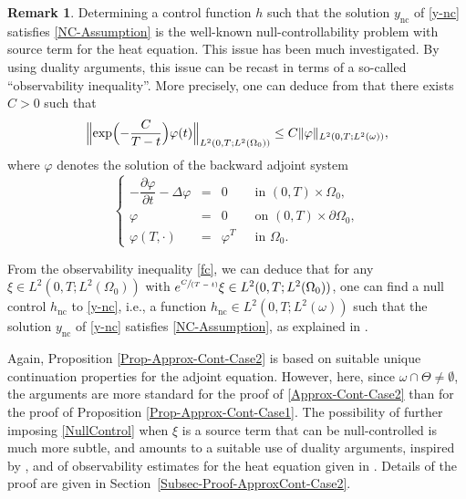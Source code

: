 \documentclass[11pt]{article}
\newcommand{\ie}{i.e.,\xspace}
\numberwithin{equation}{section}
\newcommand{\spfrac}[2]{\sfrac{#1}{(#2)}}
\newcommand{\nc}{\mathrm{nc}}
\newcommand{\Bnorm}[1]{\Bigl\Vert#1\Bigr\Vert}
\theoremstyle{definition}
\newtheorem{remark}[theorem]{Remark}
\begin{document}
\begin{remark}
Determining a control function $h$ such that the solution $y_{\nc}$ of \eqref{y-nc} satisfies \eqref{NC-Assumption} is the well-known null-controllability problem with source term for the heat equation. This issue has been much investigated. By using duality arguments, this issue can be recast in terms of a so-called ``observability inequality''. More precisely, one can deduce from \cite[Lem.\,2.1]{FursikovImanuvilov} that there exists $C>0$ such that
\begin{equation}\label{fc}
\Bnorm{\exp\Bigl(- \frac{C}{T-t}\Bigr)\varphi(t)}_ {L^2(0,T; L^2(\Omega_0))} \leq C \| \varphi \|_{L^2(0,T; L^2(\omega))},
\end{equation}
where $\varphi$ denotes the solution of the backward adjoint system
\begin{equation*}
\left\{
\begin{array}{rcll}
-\dfrac{\partial \varphi}{\partial t}-\Delta \varphi &=&0 \quad&\text{ in }(0,T) \times \Omega_0,
\\
\varphi &=& 0 &\text{ on }(0,T) \times \partial \Omega_0,
\\
\varphi\left(T,\cdot\right) &=& \varphi^T &\text{ in }\Omega_0.
\end{array}
\right.
\end{equation*}

From the observability inequality \eqref{fc}, we can deduce that for any $\xi\in L^2(0,T; L^2(\Omega_0))$ with $e^{\spfrac{C}{T-t}}\xi \in L^2(0,T; L^2(\Omega_0))$, one can find a null control $h_{\nc}$ to \eqref{y-nc}, \ie a function $h_{\nc} \in L^2(0,T; L^2(\omega))$ such that the solution $y_{\nc}$ of \eqref{y-nc} satisfies \eqref{NC-Assumption}, as explained in \cite[Proof of Th.\,2.1]{FursikovImanuvilov}.
\end{remark}

Again, Proposition \ref{Prop-Approx-Cont-Case2} is based on suitable unique continuation properties for the adjoint equation. However, here, since $\omega \cap \Theta \neq\emptyset$, the arguments are more standard for the proof of \eqref{Approx-Cont-Case2} {than for the proof of Proposition \ref{Prop-Approx-Cont-Case1}}. The possibility of further imposing \eqref{NullControl} when $\xi$ is a source term that can be null-controlled is much more subtle, and amounts to a suitable use of duality arguments, inspired by \cite{Lions-1992}, and of observability estimates for the heat equation given in \cite{FursikovImanuvilov}. Details of the proof are given in Section~\ref{Subsec-Proof-ApproxCont-Case2}.
\end{document}
